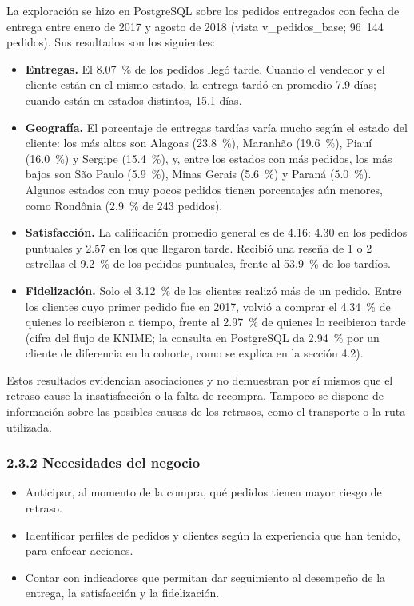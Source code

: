 \documentclass[a4paper,stu,12pt,donotrepeattitle,floatsintext]{apa7}
\begin{document}
La exploración se hizo en PostgreSQL sobre los pedidos entregados con fecha de entrega entre enero de 2017 y agosto de 2018 (vista v\_\allowbreak{}pedidos\_\allowbreak{}base; 96~144 pedidos). Sus resultados son los siguientes:

\begin{itemize}
\item \textbf{Entregas.} El 8.07~\% de los pedidos llegó tarde. Cuando el vendedor y el cliente están en el mismo estado, la entrega tardó en promedio 7.9 días; cuando están en estados distintos, 15.1 días.
\item \textbf{Geografía.} El porcentaje de entregas tardías varía mucho según el estado del cliente: los más altos son Alagoas (23.8~\%), Maranhão (19.6~\%), Piauí (16.0~\%) y Sergipe (15.4~\%), y, entre los estados con más pedidos, los más bajos son São Paulo (5.9~\%), Minas Gerais (5.6~\%) y Paraná (5.0~\%). Algunos estados con muy pocos pedidos tienen porcentajes aún menores, como Rondônia (2.9~\% de 243 pedidos).
\item \textbf{Satisfacción.} La calificación promedio general es de 4.16: 4.30 en los pedidos puntuales y 2.57 en los que llegaron tarde. Recibió una reseña de 1 o 2 estrellas el 9.2~\% de los pedidos puntuales, frente al 53.9~\% de los tardíos.
\item \textbf{Fidelización.} Solo el 3.12~\% de los clientes realizó más de un pedido. Entre los clientes cuyo primer pedido fue en 2017, volvió a comprar el 4.34~\% de quienes lo recibieron a tiempo, frente al 2.97~\% de quienes lo recibieron tarde (cifra del flujo de KNIME; la consulta en PostgreSQL da 2.94~\% por un cliente de diferencia en la cohorte, como se explica en la sección 4.2).
\end{itemize}
Estos resultados evidencian asociaciones y no demuestran por sí mismos que el retraso cause la insatisfacción o la falta de recompra. Tampoco se dispone de información sobre las posibles causas de los retrasos, como el transporte o la ruta utilizada.

\subsubsection{2.3.2 Necesidades del negocio}
\begin{itemize}
\item Anticipar, al momento de la compra, qué pedidos tienen mayor riesgo de retraso.
\item Identificar perfiles de pedidos y clientes según la experiencia que han tenido, para enfocar acciones.
\item Contar con indicadores que permitan dar seguimiento al desempeño de la entrega, la satisfacción y la fidelización.
\end{itemize}
\end{document}
